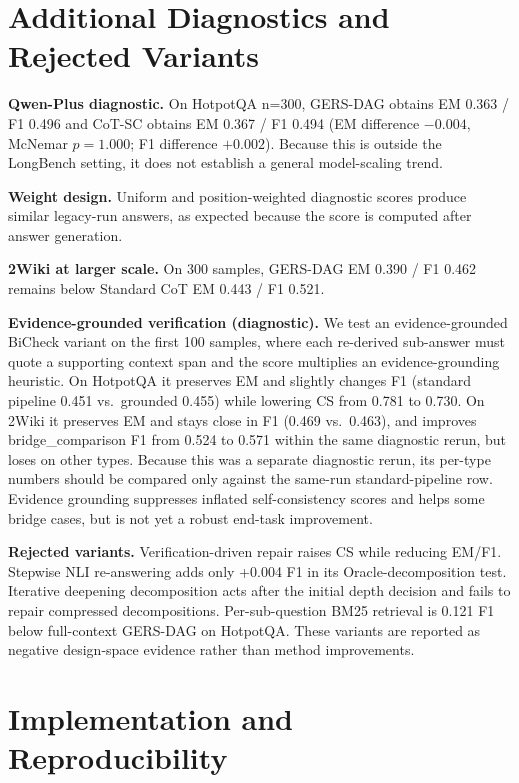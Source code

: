 \documentclass[11pt]{article}
\begin{document}
\section{Additional Diagnostics and Rejected Variants}

\textbf{Qwen-Plus diagnostic.} On HotpotQA n=300, GERS-DAG obtains EM 0.363 / F1 0.496 and CoT-SC obtains EM 0.367 / F1 0.494 (EM difference $-0.004$, McNemar $p=1.000$; F1 difference $+0.002$). Because this is outside the LongBench setting, it does not establish a general model-scaling trend.

\textbf{Weight design.} Uniform and position-weighted diagnostic scores produce similar legacy-run answers, as expected because the score is computed after answer generation.

\textbf{2Wiki at larger scale.} On 300 samples, GERS-DAG EM 0.390 / F1 0.462 remains below Standard CoT EM 0.443 / F1 0.521.

\textbf{Evidence-grounded verification (diagnostic).} We test an evidence-grounded BiCheck variant on the first 100 samples, where each re-derived sub-answer must quote a supporting context span and the score multiplies an evidence-grounding heuristic. On HotpotQA it preserves EM and slightly changes F1 (standard pipeline 0.451 vs.\ grounded 0.455) while lowering CS from 0.781 to 0.730. On 2Wiki it preserves EM and stays close in F1 (0.469 vs.\ 0.463), and improves bridge\_comparison F1 from 0.524 to 0.571 within the same diagnostic rerun, but loses on other types. Because this was a separate diagnostic rerun, its per-type numbers should be compared only against the same-run standard-pipeline row. Evidence grounding suppresses inflated self-consistency scores and helps some bridge cases, but is not yet a robust end-task improvement.

\textbf{Rejected variants.} Verification-driven repair raises CS while reducing EM/F1. Stepwise NLI re-answering adds only +0.004 F1 in its Oracle-decomposition test. Iterative deepening decomposition acts after the initial depth decision and fails to repair compressed decompositions. Per-sub-question BM25 retrieval is 0.121 F1 below full-context GERS-DAG on HotpotQA. These variants are reported as negative design-space evidence rather than method improvements.

\section{Implementation and Reproducibility}
\end{document}
